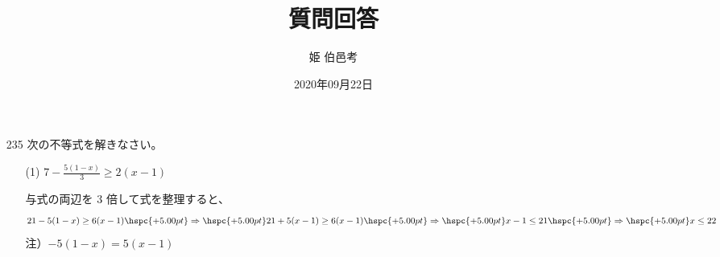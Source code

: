 \documentclass[10pt,a4paper,disablejfam,dvipdfmx,fleqn,onecolumn,oneside,openany,report]{jsarticle}
\title{質問回答} \author{姫 伯邑考} \date{2020年09月22日}
\begin{document}
\maketitle
\begin{itemize}
\item[235] 次の不等式を解きなさい。
  \begin{itemize}\setlength{\leftskip}{-1.00zw}%
  \item[(1)] $\displaystyle{7-\frac{5(1-x)}{3}} \ge 2(x-1)$ 
    \begin{solve}
      与式の両辺を 3 倍して式を整理すると、
      \begin{align*}
        21-5(1-x) \ge 6(x-1) \hspc{+5.00pt} \Rightarrow \hspc{+5.00pt} 21+5(x-1) \ge 6(x-1) \hspc{+5.00pt} \Rightarrow \hspc{+5.00pt} x-1 \le 21 \hspc{+5.00pt} \Rightarrow \hspc{+5.00pt} x \le 22
      \end{align*}
      注）$-5(1-x) = 5(x-1)$ \\
    \end{solve}
  \end{itemize}
\end{itemize}
\end{document}
